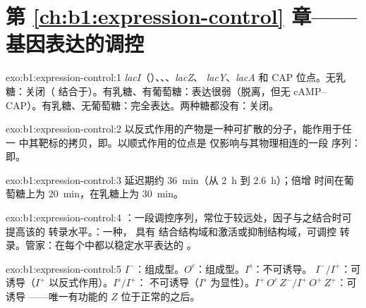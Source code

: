 \section*{第 \ref{ch:b1:expression-control} 章——基因表达的调控}

\begin{solution}{exo:b1:expression-control:1}
\emph{lacI}（）、、、\emph{lacZ}、
\emph{lacY}、\emph{lacA} 和 CAP 位点。无乳糖：关闭（
结合于）。有乳糖、有葡萄糖：表达很弱（脱离，但无
cAMP--CAP）。有乳糖、无葡萄糖：完全表达。两种糖都没有：关闭。
\end{solution}

\begin{solution}{exo:b1:expression-control:2}
以反式作用的产物是一种可扩散的分子，能作用于任一
中其靶标的拷贝，即。以顺式作用的位点是
仅影响与其物理相连的一段  序列：
即。
\end{solution}

\begin{solution}{exo:b1:expression-control:3}
延迟期约 \qty{36}{min}（从 \qty{2}{h} 到 \qty{2.6}{h}）；倍增
时间在葡萄糖上为 \qty{20}{min}，在乳糖上为 \qty{30}{min}。
\end{solution}

\begin{solution}{exo:b1:expression-control:4}
：一段调控序列，常位于较远处，因子与之结合时可提高该的
转录水平。：一种，
具有  结合结构域和激活或抑制结构域，可调控
转录。管家：在每个中都以稳定水平表达的
。
\end{solution}

\begin{solution}{exo:b1:expression-control:5}
$I^-$：组成型。$O^c$：组成型。$I^s$：不可诱导。
$I^-/I^+$：可诱导（$I^+$ 以反式作用）。$I^s/I^+$：
不可诱导（$I^s$ 为显性）。$I^+\,O^c\,Z^- / I^+\,O^+\,Z^+$：可诱导
——唯一有功能的 $Z$ 位于正常的之后。
\end{solution}

